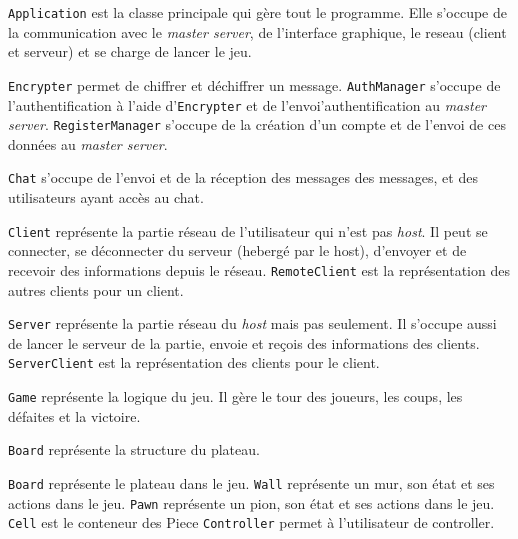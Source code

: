 \documentclass[a4paper,10pt]{article}
\newcommand{\cmd}{\texttt}
\begin{document}
\cmd{Application} est la classe principale qui gère tout le programme. Elle s'occupe de la communication avec le \textit{master server}, de l'interface graphique, le reseau (client et serveur) et se charge de lancer le jeu.

\cmd{Encrypter} permet de chiffrer et déchiffrer un message.
\cmd{AuthManager} s'occupe de l'authentification à l'aide d'\cmd{Encrypter} et de l'envoi'authentification au \textit{master server}.
\cmd{RegisterManager} s'occupe de la création d'un compte et de l'envoi de ces données au \textit{master server}.

\cmd{Chat} s'occupe de l'envoi et de la réception des messages des messages, et des utilisateurs ayant accès au chat.

\cmd{Client} représente la partie réseau de l'utilisateur qui n'est pas \textit{host}. Il peut se connecter, se déconnecter du serveur (hebergé par le host), d'envoyer et de recevoir des informations depuis le réseau.
\cmd{RemoteClient} est la représentation des autres clients pour un client.

\cmd{Server} représente la partie réseau du \textit{host} mais pas seulement. Il s'occupe aussi de lancer le serveur de la partie, envoie et reçois des informations des clients. 
\cmd{ServerClient} est la représentation des clients pour le client.

\cmd{Game} représente la logique du jeu. Il gère le tour des joueurs, les coups, les défaites et la victoire.

\cmd{Board} représente la structure du plateau.

\cmd{Board} représente le plateau dans le jeu.
\cmd{Wall} représente un mur, son état et ses actions dans le jeu.
\cmd{Pawn} représente un pion, son état et ses actions dans le jeu.
\cmd{Cell} est le conteneur des {Piece}
\cmd{Controller} permet à l'utilisateur de controller.
\end{document}
